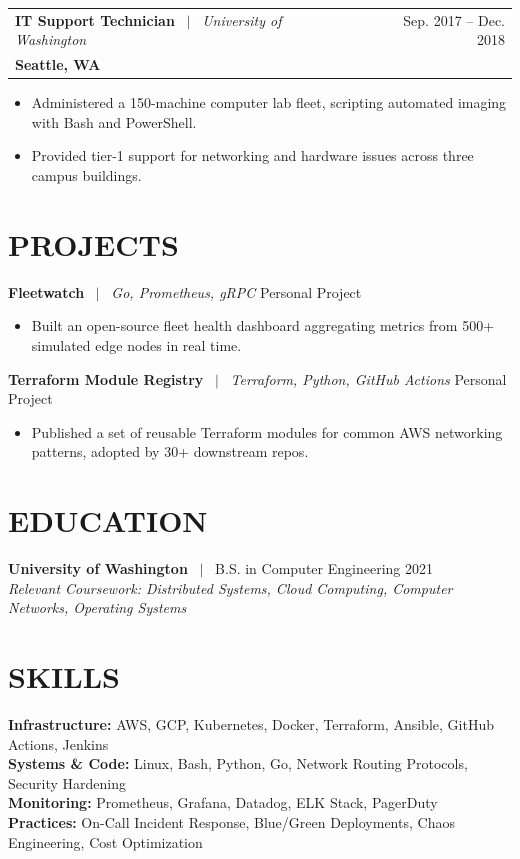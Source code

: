 \documentclass[10pt,letterpaper]{article}
\makeatletter
\newcommand{\job}[4]{
  \vspace{4pt}
  \begin{tabular*}{1.0\textwidth}[t]{l@{\extracolsep{\fill}}r}
    \textbf{\color{primary}#1} \ $|$ \ \textit{\color{secondary}#2} & \color{secondary}#4 \\
    \textbf{\color{secondary}\small #3} & \\
  \end{tabular*}\vspace{-4pt}
}
\makeatother
\begin{document}
\job{IT Support Technician}{University of Washington}{Seattle, WA}{Sep. 2017 -- Dec. 2018}
\begin{itemize}[leftmargin=0.15in, topsep=2pt, itemsep=2pt]
    \item Administered a 150-machine computer lab fleet, scripting automated imaging with Bash and PowerShell.
    \item Provided tier-1 support for networking and hardware issues across three campus buildings.
\end{itemize}

\section{PROJECTS}
\textbf{Fleetwatch} \ $|$ \ \textit{Go, Prometheus, gRPC} \hfill Personal Project
\begin{itemize}[leftmargin=0.15in, topsep=2pt, itemsep=2pt]
    \item Built an open-source fleet health dashboard aggregating metrics from 500+ simulated edge nodes in real time.
\end{itemize}

\textbf{Terraform Module Registry} \ $|$ \ \textit{Terraform, Python, GitHub Actions} \hfill Personal Project
\begin{itemize}[leftmargin=0.15in, topsep=2pt, itemsep=2pt]
    \item Published a set of reusable Terraform modules for common AWS networking patterns, adopted by 30+ downstream repos.
\end{itemize}

\section{EDUCATION}
\textbf{University of Washington} \ $|$ \ B.S. in Computer Engineering \hfill 2021 \\
\textit{\small Relevant Coursework: Distributed Systems, Cloud Computing, Computer Networks, Operating Systems}

\section{SKILLS}
\textbf{Infrastructure:} AWS, GCP, Kubernetes, Docker, Terraform, Ansible, GitHub Actions, Jenkins \\
\textbf{Systems \& Code:} Linux, Bash, Python, Go, Network Routing Protocols, Security Hardening \\
\textbf{Monitoring:} Prometheus, Grafana, Datadog, ELK Stack, PagerDuty \\
\textbf{Practices:} On-Call Incident Response, Blue/Green Deployments, Chaos Engineering, Cost Optimization
\end{document}
